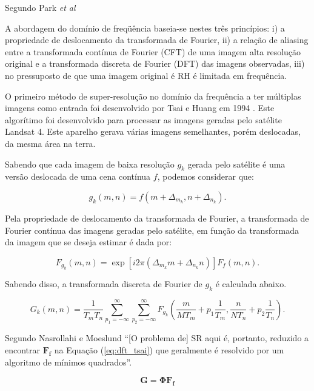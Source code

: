 Segundo Park \emph{et al} 
\begin{citacao}
	A abordagem do domínio de freqüência baseia-se nestes três princípios: i)
	a propriedade de deslocamento da transformada de Fourier, ii) a relação
	de aliasing entre a transformada contínua de Fourier (CFT) de uma
	imagem alta resolução original e a transformada discreta de Fourier
	(DFT) das imagens observadas, iii) no pressuposto de que uma imagem
	original é RH é limitada em frequência. \cite{park2003super}
\end{citacao}

O primeiro método de super-resolução no domínio da frequência a ter múltiplas imagens como entrada foi desenvolvido por Tsai e Huang em 1994 \cite{nasrollahi2014super}.
Este algorítimo foi desenvolvido para processar as imagens geradas pelo satélite Landsat 4.
Este aparelho gerava várias imagens semelhantes, porém deslocadas, da mesma área na
terra.

Sabendo que cada imagem de baixa resolução $g_k$ gerada pelo satélite é uma versão deslocada de uma cena contínua $f$, podemos considerar que:

\begin{equation}
	g_k(m,n) = f(m + \Delta_{m_k}, n + \Delta_{n_k}).
\end{equation}

Pela propriedade de deslocamento da transformada de Fourier, a transformada de Fourier contínua das imagens geradas pelo satélite, em função da transformada da imagem que se deseja estimar é dada por:

\begin{equation}
	F_{g_k} (m,n) = \exp{[i2\pi (\Delta_{m_k}m + \Delta_{n_k}n)]} F_f (m,n).
\end{equation}

Sabendo disso, a transformada discreta de Fourier de $g_k$ é calculada abaixo.

\begin{equation}
	G_k(m,n) = \frac{1}{T_m T_n} \sum^\infty_{p_1=-\infty} \sum^\infty_{p_2=-\infty}
	F_{g_k} \left( \frac{m}{MT_m} + p_1 \frac{1}{T_m},
	\frac{n}{NT_n} + p_2\frac{1}{T_n} \right).
\end{equation}

Segundo Nasrollahi e Moeslund \cite{nasrollahi2014super} ``[O problema de] SR aqui é, portanto, reduzido a encontrar $\mathbf{ F_f}$ na Equação (\ref{eq:dft_tsai}) que geralmente é resolvido por um algoritmo de mínimos quadrados''.

\begin{equation}
	\label{eq:dft_tsai}
	\mathbf{G} = \mathbf{\Phi F_f}
\end{equation}

